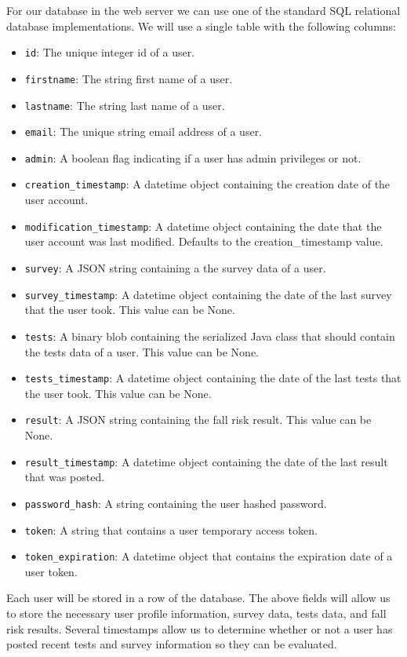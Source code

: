 \documentclass[conference]{IEEEtran}
\begin{document}
For our database in the web server we can use one of the standard SQL relational database implementations. We will use a single table with the following columns:
\begin{itemize}
    \item \texttt{id}: The unique integer id of a user.
    \item \texttt{firstname}: The string first name of a user.
    \item \texttt{lastname}: The string last name of a user.
    \item \texttt{email}: The unique string email address of a user.
    \item \texttt{admin}: A boolean flag indicating if a user has admin privileges or not.
    \item \texttt{creation\_timestamp}: A datetime object containing the creation date of the user account.
    \item \texttt{modification\_timestamp}: A datetime object containing the date that the user account was last modified. Defaults to the creation\_timestamp value.
    \item \texttt{survey}: A JSON string containing a the survey data of a user.
    \item \texttt{survey\_timestamp}: A datetime object containing the date of the last survey that the user took. This value can be None.
    \item \texttt{tests}: A binary blob containing the serialized Java class that should contain the tests data of a user. This value can be None.
    \item \texttt{tests\_timestamp}: A datetime object containing the date of the last tests that the user took. This value can be None.
    \item \texttt{result}: A JSON string containing the fall risk result. This value can be None.
    \item \texttt{result\_timestamp}: A datetime object containing the date of the last result that was posted.
    \item \texttt{password\_hash}: A string containing the user hashed password.
    \item \texttt{token}: A string that contains a user temporary access token.
    \item \texttt{token\_expiration}: A datetime object that contains the expiration date of a user token.
\end{itemize}
Each user will be stored in a row of the database. The above fields will allow us to store the necessary user profile information, survey data, tests data, and fall risk results. Several timestamps allow us to determine whether or not a user has posted recent tests and survey information so they can be evaluated.
\end{document}
